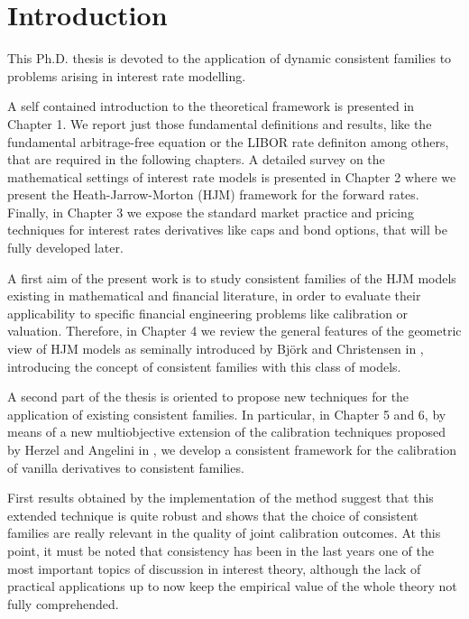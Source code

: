 \chapter*{Introduction}
This Ph.D. thesis is devoted to the application of dynamic consistent
families to problems arising in interest rate modelling. 

 A self contained introduction to the theoretical framework is
presented in Chapter 1. We report just those fundamental definitions
and results, like the fundamental arbitrage-free equation or the LIBOR
rate definiton among others, that are required in the following
chapters. A detailed survey on the mathematical settings of interest
rate models is presented in Chapter 2 where we present the 
Heath-Jarrow-Morton (HJM) framework for the forward rates. Finally, in
Chapter 3 we expose the standard market practice and pricing
techniques for interest rates derivatives like caps and bond options,
that will be fully developed later.

A first aim of the present work is to study consistent families of the
HJM models existing in mathematical and 
financial literature, in order to evaluate their applicability to
specific financial engineering problems like calibration or
valuation. Therefore, in Chapter 4 we review the general features 
of the geometric view of HJM models as seminally introduced by Bj\"ork
and Christensen in \cite{BC:1999}, introducing the concept of
consistent families with this class of models. 

A second part of the thesis is oriented to propose new techniques for
the application of existing consistent families. In particular, in
Chapter 5 and 6, by means of a new multiobjective extension of the
calibration techniques proposed by Herzel and Angelini in
\cite{AH:2002,AH:2005}, we develop a consistent framework for the
calibration of vanilla derivatives to consistent families.

First results obtained by the implementation of the method suggest
that this extended technique is quite robust and shows that the choice
of consistent families are really relevant in the quality of joint
calibration outcomes. At this point, it must be noted that consistency
has been in the last years one of the most important topics of
discussion in interest theory, although the lack of practical
applications up to now keep the empirical value of the whole theory
not fully comprehended. 

